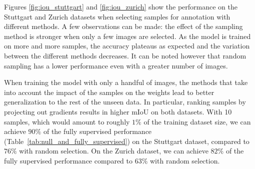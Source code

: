 \documentclass[letterpaper, 10 pt, conference]{ieeeconf}  %
\begin{document}
   
 
Figures \ref{fig:iou_stuttgart} and \ref{fig:iou_zurich} show the performance on the Stuttgart and Zurich datasets when selecting samples for annotation with different methods.  
A few observations can be made: the effect of the sampling method is stronger when only a few images are selected. As the model is trained on more and more samples, the accuracy plateaus as expected and the variation between the different methods decreases. It can be noted however that random sampling has a lower performance even with a greater number of images.

When training the model with only a handful of images, the methods that take into account the impact of the samples on the weights lead to better generalization to the rest of the unseen data. In particular, ranking samples by projecting out gradients results in higher mIoU on both datasets. With 10 samples, which would amount to roughly $1\%$ of the training dataset size, we can achieve $90\%$ of the fully supervised performance (Table~\ref{tab:null_and_fully_supervised}) on the Stuttgart dataset, compared to $76\%$ with random selection. On the Zurich dataset, we can achieve $82\%$ of the fully supervised performance compared to $63\%$ with random selection.

   
%
   

\end{document}
